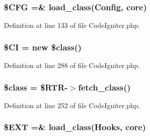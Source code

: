 \subsubsection[{\texorpdfstring{\$\+C\+FG}{$CFG}}]{\setlength{\rightskip}{0pt plus 5cm}\$C\+FG =\& load\+\_\+class(\textquotesingle{}Config\textquotesingle{}, \textquotesingle{}core\textquotesingle{})}\hypertarget{_code_igniter_8php_adb9373e11e42b2cd55d1fe249ae72deb}{}\label{_code_igniter_8php_adb9373e11e42b2cd55d1fe249ae72deb}


Definition at line 133 of file Code\+Igniter.\+php.

\subsubsection[{\texorpdfstring{\$\+CI}{$CI}}]{\setlength{\rightskip}{0pt plus 5cm}\$CI = new \$class()}\hypertarget{_code_igniter_8php_ae0314d046ddf7fcfaec03222977427d3}{}\label{_code_igniter_8php_ae0314d046ddf7fcfaec03222977427d3}


Definition at line 288 of file Code\+Igniter.\+php.

\subsubsection[{\texorpdfstring{\$class}{$class}}]{\setlength{\rightskip}{0pt plus 5cm}\$class = \$R\+TR-\/$>$fetch\+\_\+class()}\hypertarget{_code_igniter_8php_a252ba022809910ea710a068fc1bab657}{}\label{_code_igniter_8php_a252ba022809910ea710a068fc1bab657}


Definition at line 252 of file Code\+Igniter.\+php.

\subsubsection[{\texorpdfstring{\$\+E\+XT}{$EXT}}]{\setlength{\rightskip}{0pt plus 5cm}\${\bf E\+XT} =\& load\+\_\+class(\textquotesingle{}Hooks\textquotesingle{}, \textquotesingle{}core\textquotesingle{})}\hypertarget{_code_igniter_8php_ab97aae9bc0aae04b84d360a29a3c035b}{}\label{_code_igniter_8php_ab97aae9bc0aae04b84d360a29a3c035b}


